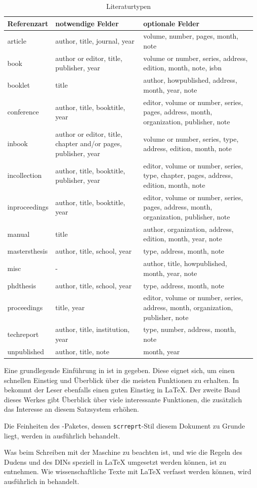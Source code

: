 \begin{table}[htbp]
\centering
\begin{tabular}{p{}p{}p{}}
\toprule
Referenzart & notwendige Felder & optionale Felder\\
\midrule
article & author, title, journal, year & volume, number, pages, month, note\\
book & author or editor, title, publisher, year & volume or number, series,
address, edition, month, note, isbn\\
booklet & title & author, howpublished, address, month, year, note\\
conference & author, title, booktitle, year & editor, volume or number, series,
pages, address, month, organization, publisher, note\\
inbook & author or editor, title, chapter and/or pages, publisher, year & volume
or number, series, type, address, edition, month, note\\
incollection & author, title, booktitle, publisher, year & editor, volume or
number, series, type, chapter, pages, address, edition, month, note\\
inproceedings & author, title, booktitle, year & editor, volume or number,
series, pages, address, month, organization, publisher, note\\
manual & title & author, organization, address, edition, month, year, note\\
mastersthesis & author, title, school, year & type, address, month, note\\
misc & - & author, title, howpublished, month, year, note\\
phdthesis & author, title, school, year & type, address, month, note\\
proceedings & title, year & editor, volume or number, series, address, month,
organization, publisher, note\\
techreport & author, title, institution, year & type, number, address, month,
note\\
unpublished & author, title, note & month, year\\
\bottomrule
\end{tabular}
\caption{Literaturtypen}
\label{tab:bibTeX}
\end{table}

Eine grundlegende Einführung in \LaTeXe{} ist in \cite{Schmidt2003} gegeben.
Diese eignet sich, um einen schnellen Einstieg und Überblick über die meisten
Funktionen zu erhalten. In \cite{Juergens2000} bekommt der Leser ebenfalls einen
guten Einstieg in \LaTeX. Der zweite Band dieses Werkes \cite{Juergens1995} gibt
Überblick über viele interessante Funktionen, die zusätzlich das Interesse an
diesem Satzsystem erhöhen.

Die Feinheiten des \KOMAScript-Paketes, dessen \verb!scrreprt!-Stil diesem
Dokument zu Grunde liegt, werden in \cite{Neukam2003} ausführlich behandelt.

Was beim Schreiben mit der Maschine zu beachten ist, und wie die Regeln des
Dudens und des DINs speziell in \LaTeX{} umgesetzt werden können, ist
\cite{Struckmann2004} zu entnehmen. Wie wissenschaftliche Texte mit \LaTeX{}
verfasst werden können, wird ausführlich in \cite{Farwer2005} behandelt.
